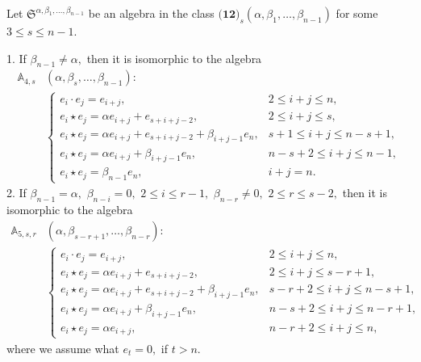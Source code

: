 \documentclass{jonasart}
\begin{document}
	\begin{lemma}\label{12-lem-alpha_2 -s} Let $\mathfrak{S}^{\alpha, \beta_{1},\dots, \beta_{n-1}}$ be an algebra in the class $\textbf{(12)}_s (\alpha, \beta_{1},\dots,\beta_{n-1})$ for some $3\leq s\leq n-1.$

		1. If $\beta_{n-1} \neq \alpha,$ then it is isomorphic to the algebra
		\begin{align*}
			\mathbb{A}_{4,s}&(\alpha,\beta_s,\dots,\beta_{n-1}): \\
            &\left\{
			\begin{array}{ll}
				e_i\cdot e_j =e_{i+j}, & 2\leq i+j \leq n, \\[1mm]
				e_i\star e_j =\alpha e_{i+j}+ e_{s+i+j-2}, & 2\leq i+j \leq s, \\[1mm]
				e_i\star e_j =\alpha e_{i+j}+ e_{s+i+j-2} + \beta_{i+j-1}e_n, & s+1 \leq i+j \leq n-s+1, \\[1mm]
				e_i\star e_j =\alpha e_{i+j} + \beta_{i+j-1}e_n, & n-s+2 \leq i+j \leq n-1, \\[1mm]
				e_i \star e_j =\beta_{n-1} e_{n}, & i+j = n.
			\end{array}
			\right.
		\end{align*}
		2. If $\beta_{n-1} = \alpha,$ $\beta_{n-i} = 0,$ $ 2 \le i \le {r-1},$ $\beta_{n-r} \neq 0,$ $2 \leq r \leq s-2,$ then it is isomorphic to the algebra
		\begin{align*}
			\mathbb{A}_{5,s,r}&(\alpha,\beta_{s-r+1},\dots,\beta_{n-r}): \\
            &\left\{
			\begin{array}{ll}
				e_i\cdot e_j = e_{i+j}, & 2\leq i+j \leq n, \\[1mm]
				e_i\star e_j =\alpha e_{i+j} + e_{s+i+j-2}, & 2\leq i+j \leq s-r+1, \\[1mm]
				e_i\star e_j =\alpha e_{i+j} + e_{s+i+j-2} +\beta_{i+j-1} e_n, & s-r+2 \leq i+j \leq n-s+1, \\[1mm]
				e_i\star e_j =\alpha e_{i+j}+ \beta_{i+j-1} e_n, & n-s+2 \leq i+j \leq n-r+1, \\[1mm]
				e_i\star e_j =\alpha e_{i+j}, & n-r+2 \leq i+j \leq n,
			\end{array}
			\right.
		\end{align*}
		where we assume what $e_t =0,$ if $t>n.$


\end{lemma}
\end{document}
